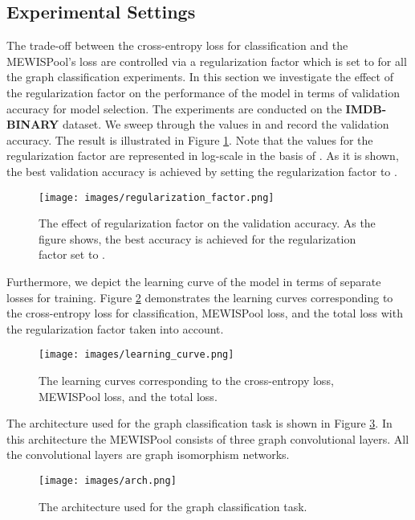 \documentclass{article}
\begin{document}
\subsection{Experimental Settings}

The trade-off between the cross-entropy loss for classification and the MEWISPool’s loss are controlled via a regularization factor which is set to  for all the graph classification experiments. In this section we investigate the effect of the regularization factor on the performance of the model in terms of validation accuracy for model selection. The experiments are conducted on the \textbf{IMDB-BINARY} dataset. We sweep through the values in  and record the validation accuracy. The result is illustrated in Figure \ref{fig:reg-fac}. Note that the values for the regularization factor are represented in log-scale in the basis of .  As it is shown, the best validation accuracy is achieved by setting the regularization factor to .
\begin{figure}[!ht]
	\begin{center}
		\texttt{[image: images/regularization\_factor.png]}
		\caption{The effect of regularization factor on the validation accuracy. As the figure shows, the best accuracy is achieved for the regularization factor set to .}
		\label{fig:reg-fac}
	\end{center}
\end{figure}

Furthermore, we depict the learning curve of the model in terms of separate losses for training. Figure \ref{fig:learn-curve} demonstrates the learning curves corresponding to the cross-entropy loss for classification, MEWISPool loss, and the total loss with the regularization factor taken into account.
\begin{figure}[!ht]
	\begin{center}
		\texttt{[image: images/learning\_curve.png]}
		\caption{The learning curves corresponding to the cross-entropy loss, MEWISPool loss, and the total loss.}
		\label{fig:learn-curve}
	\end{center}
\end{figure}
The architecture used for the graph classification task is shown in Figure \ref{fig:arch}. In this architecture the MEWISPool consists of three graph convolutional layers. All the convolutional layers are graph isomorphism networks.
\begin{figure}[!ht]
	\begin{center}
		\texttt{[image: images/arch.png]}
		\caption{The architecture used for the graph classification task.}
		\label{fig:arch}
	\end{center}
\end{figure}
\end{document}
